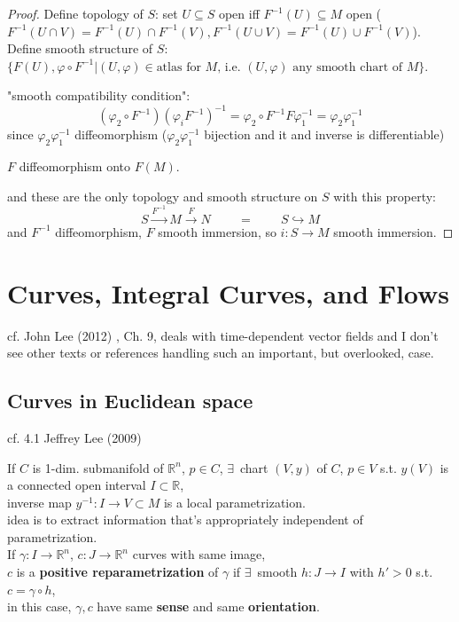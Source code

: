 \begin{proof}
Define topology of $S$: set $U\subseteq S$ open iff $F^{-1}(U) \subseteq M$ open ($F^{-1}(U\cap V) = F^{-1}(U) \cap F^{-1}(V), F^{-1}(U\cup V) =F^{-1}(U) \cup F^{-1}(V)$).  \\
Define smooth structure of $S$: $\lbrace F(U), \varphi \circ F^{-1}  | (U,\varphi) \in \text{atlas for $M$, i.e. $(U,\varphi)$ any smooth chart of $M$}\rbrace$.  

"smooth compatibility condition": 
\[
(\varphi_2\circ F^{-1}) (\varphi_i F^{-1})^{-1} = \varphi_2 \circ F^{-1}F\varphi_1^{-1} = \varphi_2 \varphi_1^{-1}
\]
since $\varphi_2\varphi_1^{-1}$ diffeomorphism ($\varphi_2 \varphi_1^{-1}$ bijection and it and inverse is differentiable) 

$F$ diffeomorphism onto $F(M)$.  

	and these are the only topology and smooth structure on $S$ with this property: 
	\[
	S \xrightarrow{F^{-1}} M \xrightarrow{F} N \qquad \, = \qquad \, S \hookrightarrow M
	\]
	and $F^{-1}$ diffeomorphism, $F$ smooth immersion, so $i : S \to M$ smooth immersion.  
	\end{proof}

\section{Curves, Integral Curves, and Flows}

cf. John Lee (2012) \cite{dgdt:JLee2012}, Ch. 9, deals with time-dependent vector fields and I don't see other texts or references handling such an important, but overlooked, case.

\subsection{Curves in Euclidean space}

cf. 4.1 Jeffrey Lee (2009) \cite{dgdt:JLee2009}

If $C$ is 1-dim. submanifold of $\mathbb{R}^n$, $p\in C$, $\exists \, $ chart $(V, y)$ of $C$, $p\in V$ s.t. $y(V)$ is a connected open interval $I \subset \mathbb{R}$, \\
inverse map $y^{-1} : I \to V \subset M$ is a local parametrization. \\
idea is to extract information that's appropriately independent of parametrization. \\

If $\gamma : I \to \mathbb{R}^n$, $c: J \to \mathbb{R}^n$ curves with same image, \\
$c$ is a \textbf{positive reparametrization} of $\gamma$ if $\exists \, $ smooth $h: J \to I$ with $h' > 0 $ s.t. $c = \gamma \circ h$, \\
in this case, $\gamma, c$ have same \textbf{sense} and same \textbf{orientation}. \\

